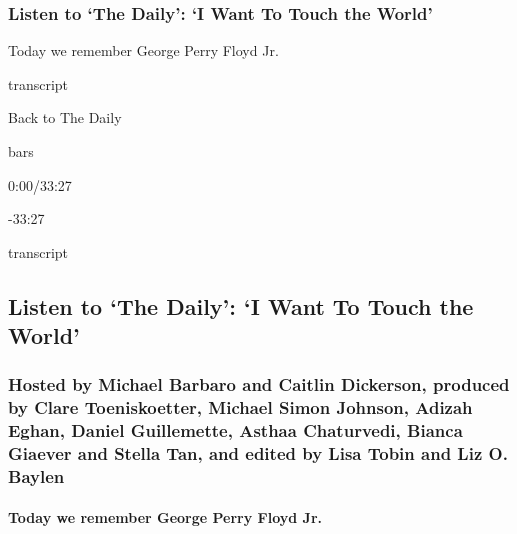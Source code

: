 \hypertarget{listen-to-the-daily-i-want-to-touch-the-world}{%
\subsubsection{Listen to `The Daily': `I Want To Touch the
World'}\label{listen-to-the-daily-i-want-to-touch-the-world}}

Today we remember George Perry Floyd Jr.

transcript

Back to The Daily

bars

0:00/33:27

-33:27

transcript

\hypertarget{listen-to-the-daily-i-want-to-touch-the-world-1}{%
\subsection{Listen to `The Daily': `I Want To Touch the
World'}\label{listen-to-the-daily-i-want-to-touch-the-world-1}}

\hypertarget{hosted-by-michael-barbaro-and-caitlin-dickerson-produced-by-clare-toeniskoetter-michael-simon-johnson-adizah-eghan-daniel-guillemette-asthaa-chaturvedi-bianca-giaever-and-stella-tan-and-edited-by-lisa-tobin-and-liz-o-baylen}{%
\subsubsection{Hosted by Michael Barbaro and Caitlin Dickerson, produced
by Clare Toeniskoetter, Michael Simon Johnson, Adizah Eghan, Daniel
Guillemette, Asthaa Chaturvedi, Bianca Giaever and Stella Tan, and
edited by Lisa Tobin and Liz O.
Baylen}\label{hosted-by-michael-barbaro-and-caitlin-dickerson-produced-by-clare-toeniskoetter-michael-simon-johnson-adizah-eghan-daniel-guillemette-asthaa-chaturvedi-bianca-giaever-and-stella-tan-and-edited-by-lisa-tobin-and-liz-o-baylen}}

\hypertarget{today-we-remember-george-perry-floyd-jr}{%
\paragraph{Today we remember George Perry Floyd
Jr.}\label{today-we-remember-george-perry-floyd-jr}}

